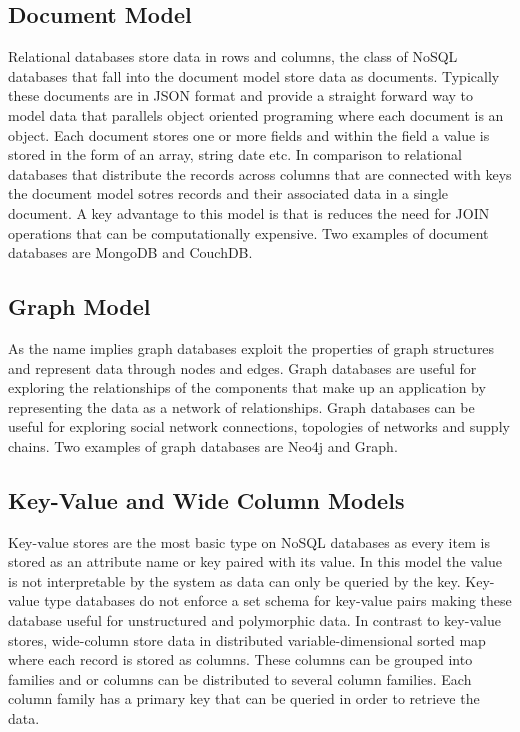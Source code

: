 


\subsection{Document Model}
Relational databases store data in rows and columns, the class of
NoSQL databases that fall into the document model store data as
documents. Typically these documents are in JSON format and provide a
straight forward way to model data that parallels object oriented
programing where each document is an object. Each document stores one
or more fields and within the field a value is stored in the form of
an array, string date etc. In comparison to relational databases that
distribute the records across columns that are connected with keys the
document model sotres records and their associated data in a single
document. A key advantage to this model is that is reduces the need
for JOIN operations that can be computationally expensive. Two
examples of document databases are MongoDB and CouchDB. 

\subsection{Graph Model}
As the name implies graph databases exploit the properties of graph
structures and represent data through nodes and edges. Graph databases
are useful for exploring the relationships of the components that make
up an application by representing the data as a network of
relationships. Graph databases can be useful for exploring social
network connections, topologies of networks and supply chains. Two
examples of graph databases are Neo4j and Graph.  

\subsection{Key-Value and Wide Column Models} 
Key-value stores are the most basic type on NoSQL databases as every
item is stored as an attribute name or key paired with its value. In
this model the value is not interpretable by the system as data can
only be queried by the key. Key-value type databases do not enforce a
set schema for key-value pairs making these database useful for
unstructured and polymorphic data. In contrast to key-value stores,
wide-column store data in distributed variable-dimensional sorted
map where each record is stored as columns. These columns can be
grouped into families and or columns can be distributed to several
column families. Each column family has a primary key that can be
queried in order to retrieve the data.  

